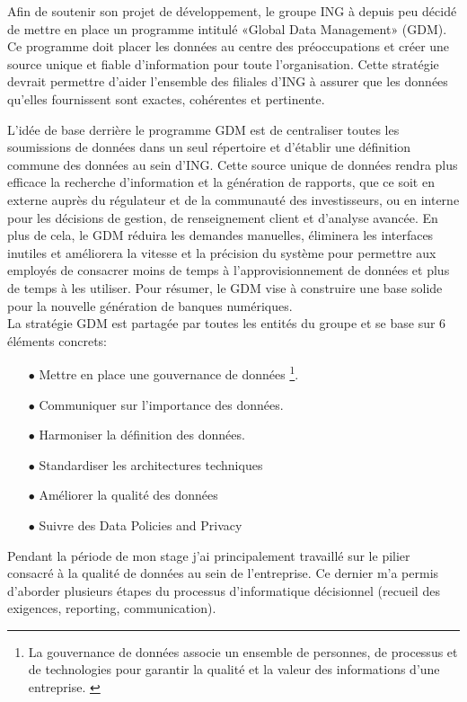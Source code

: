 \documentclass[a4paper, 12pt, french]{article}
\begin{document}
Afin de soutenir son projet de développement, le groupe ING à depuis peu décidé de mettre en place un programme intitulé «Global Data Management» (GDM). Ce programme doit placer les données au centre des préoccupations et créer une source unique et fiable d'information pour toute l’organisation. Cette stratégie devrait permettre d’aider l'ensemble des filiales d'ING à assurer que les données qu'elles fournissent sont exactes, cohérentes et pertinente. 

L'idée de base derrière le programme GDM est de centraliser toutes les soumissions de données dans un seul répertoire et d'établir une définition commune des données au sein d’ING. Cette source unique de données rendra plus efficace la recherche d'information et la génération de rapports, que ce soit en externe auprès du régulateur et de la communauté des investisseurs, ou en interne pour les décisions de gestion, de renseignement client et d'analyse avancée. En plus de cela, le GDM réduira les demandes manuelles, éliminera les interfaces inutiles et améliorera la vitesse et la précision du système pour permettre aux employés de consacrer moins de temps à l'approvisionnement de données et plus de temps à les utiliser. Pour résumer, le GDM vise à construire une base solide pour la nouvelle génération de banques numériques. \\

La stratégie GDM est partagée par toutes les entités du groupe et se base sur 6 éléments concrets:
\vspace{0.25cm}
\begin{itemize}
\item[$\bullet$] Mettre en place une gouvernance de données \footnote{La gouvernance de données associe un ensemble de personnes, de processus et de technologies pour garantir la qualité et la valeur des informations d'une entreprise. \citep{TalendLaDonnees}}.
\item[$\bullet$] Communiquer sur l'importance des données.
\item[$\bullet$] Harmoniser la définition des données.
\item[$\bullet$] Standardiser les architectures techniques
\item[$\bullet$] Améliorer la qualité des données
\item[$\bullet$] Suivre des Data Policies and Privacy
\end{itemize}
\vspace{0.5cm}

Pendant la période de mon stage j’ai principalement travaillé sur le pilier consacré à la qualité de données au sein de l’entreprise. Ce dernier m’a permis d’aborder plusieurs étapes du processus d’informatique décisionnel (recueil des exigences, reporting, communication).
\end{document}
